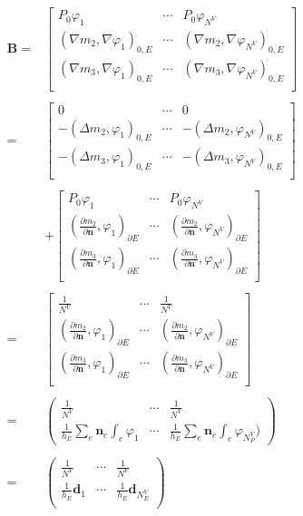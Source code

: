 \begin{equation*}
\begin{aligned}
\mathbf B = & 
\begin{bmatrix}
P_0\varphi_1 & \cdots & P_0\varphi_{N^{V}}\\
(\nabla m_2, \nabla\varphi_1)_{0, E} & \cdots & (\nabla m_2, \nabla\varphi_{N^{V}})_{0, E}\\
(\nabla m_{3}, \nabla\varphi_1)_{0, E} & \cdots & (\nabla m_{3}, \nabla\varphi_{N^{V}})_{0, E}\\
\end{bmatrix}\\
\\
=& \begin{bmatrix}
0 & \cdots & 0\\
-(\Delta m_2,\varphi_1)_{0, E} & \cdots & -(\Delta m_2,\varphi_{N^{V}})_{0, E}\\
-(\Delta m_{3}, \varphi_1)_{0, E} & \cdots & -(\Delta m_{3},\varphi_{N^{V}})_{0, E}\\
\end{bmatrix}\\
\\
& + \begin{bmatrix}
P_0\varphi_1 & \cdots & P_0\varphi_{N^{V}}\\
(\frac{ \partial m_2}{\partial \mathbf n},\varphi_1)_{\partial E} & \cdots & (\frac{\partial m_2}{\partial \mathbf n},\varphi_{N^{V}})_{\partial E}\\
(\frac{\partial m_{3}}{\partial \mathbf n}, \varphi_1)_{\partial E} & \cdots & (\frac{\partial m_{3}}{\partial \mathbf n}, \varphi_{N^{V}})_{\partial E}\\
\end{bmatrix}\\
\\
= & \begin{bmatrix}
\frac{1}{N^V} & \cdots & \frac{1}{N^V}\\
(\frac{ \partial m_2}{\partial \mathbf n},\varphi_1)_{\partial E} & \cdots & (\frac{\partial m_2}{\partial\mathbf n},\varphi_{N^{V}})_{\partial E}\\
(\frac{\partial m_{3}}{\partial\mathbf n}, \varphi_1)_{\partial E} & \cdots & (\frac{\partial m_{3}}{\partial\mathbf n}, \varphi_{N^{V}})_{\partial E}\\
\end{bmatrix}\\
\\
=&\begin{pmatrix}
\frac{1}{N^V} & \cdots  & \frac{1}{N^V}\\
\frac{1}{h_E}\sum_e \mathbf n_e\int_e\varphi_1 & \cdots& \frac{1}{h_E}\sum_e \mathbf n_e\int_e\varphi_{N^V_P})
\end{pmatrix}\\
\\
= & \begin{pmatrix}
\frac{1}{N^V} & \cdots & \frac{1}{N^V}\\
\frac{1}{h_E}\mathbf d_1 & \cdots & \frac{1}{h_E} \mathbf d_{N_E^V}\\
\end{pmatrix}\\
\end{aligned}
\end{equation*}

